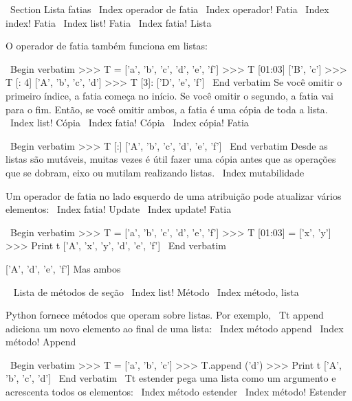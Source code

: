 \documentclass[10pt]{book}
\begin{document}
\begin {itemize}
{{{{{{\ Section {Lista fatias}
\ Index {operador de fatia}
\ Index {operador! Fatia}
\ Index {index! Fatia}
\ Index {list! Fatia}
\ Index {fatia! Lista}

O operador de fatia também funciona em listas:

\ Begin {verbatim}
>>> T = ['a', 'b', 'c', 'd', 'e', ​​'f']
>>> T [01:03]
['B', 'c']
>>> T [: 4]
['A', 'b', 'c', 'd']
>>> T [3]:
['D', 'e', ​​'f']
\ End {verbatim}
%
Se você omitir o primeiro índice, a fatia começa no início.
Se você omitir o segundo, a fatia vai para o fim. Então, se você
omitir ambos, a fatia é uma cópia de toda a lista.
\ Index {list! Cópia}
\ Index {fatia! Cópia}
\ Index {cópia! Fatia}

\ Begin {verbatim}
>>> T [:]
['A', 'b', 'c', 'd', 'e', ​​'f']
\ End {verbatim}
%
Desde as listas são mutáveis, muitas vezes é útil fazer uma cópia
antes que as operações que se dobram, eixo ou mutilam realizando
listas.
\ Index {} mutabilidade

Um operador de fatia no lado esquerdo de uma atribuição
pode atualizar vários elementos:
\ Index {fatia! Update}
\ Index {update! Fatia}

\ Begin {verbatim}
>>> T = ['a', 'b', 'c', 'd', 'e', ​​'f']
>>> T [01:03] = ['x', 'y']
>>> Print t
['A', 'x', 'y', 'd', 'e', ​​'f']
\ End {verbatim}
%


%

['A', 'd', 'e', ​​'f']%
%
Mas ambos%


\ {} Lista de métodos de seção
\ Index {list! Método}
\ Index {método, lista}

Python fornece métodos que operam sobre listas. Por exemplo,
{\ Tt} append adiciona um novo elemento ao final de uma lista:
\ Index {método append}
\ Index {método! Append}

\ Begin {verbatim}
>>> T = ['a', 'b', 'c']
>>> T.append ('d')
>>> Print t
['A', 'b', 'c', 'd']
\ End {verbatim}
%
{\ Tt estender} pega uma lista como um argumento e acrescenta todos
os elementos:
\ Index {método estender}
\ Index {método! Estender}

}}}}}}
\end{itemize}
\end{document}
